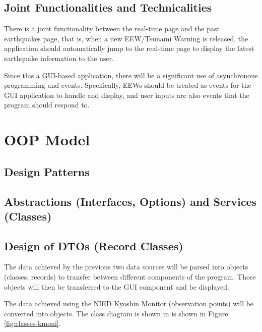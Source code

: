 \subsection{Joint Functionalities and Technicalities}

There is a joint functionality between the real-time page and the past earthquakes page, that is, when a new EEW/Tsunami Warning is released, the application should automatically jump to the real-time page to display the latest earthquake information to the user.

Since this a GUI-based application, there will be a significant use of asynchronous programming and events. Specifically, EEWs should be treated as events for the GUI application to handle and display, and user inputs are also events that the program should respond to.



\section{OOP Model}

\subsection{Design Patterns}

\subsection{Abstractions (Interfaces, Options) and Services (Classes)}

\subsection{Design of DTOs (Record Classes)}



The data achieved by the previous two data sources will be parsed into objects (classes, records) to transfer between different components of the program. Those objects will then be transferred to the GUI component and be displayed.

The data achieved using the NIED Kyoshin Monitor (observation points) will be converted into objects. The class diagram is shown in is shown in Figure \ref{fig:classes-kmoni}.

